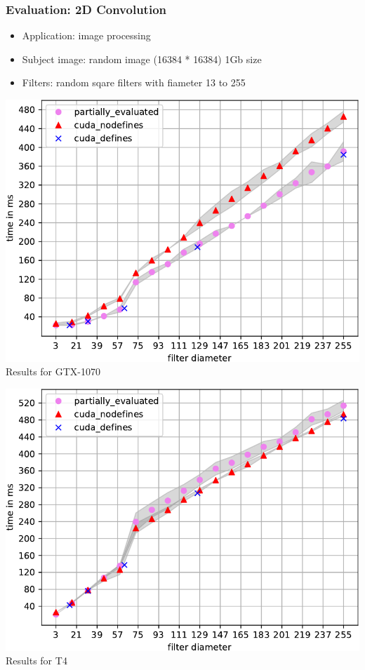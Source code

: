\documentclass[xcolor=table]{beamer}
\begin{document}
\begin{frame}[fragile] \frametitle{Evaluation: 2D Convolution}
  \begin{itemize}
  \item Application: image processing
  \item Subject image: random image (16384 * 16384) 1Gb size
  \item Filters: random sqare filters with fiameter 13 to 255
  \end{itemize}
  \begin{center}
  \begin{minipage}[t]{0.48\textwidth}
    \begin{center}
  {\includegraphics[width=\textwidth]{pictures/Conv_1070-crop}}
  \\Results for GTX-1070
\end{center}
\end{minipage}
\begin{minipage}[t]{0.48\textwidth}
  \begin{center}
{\includegraphics[width=\textwidth]{pictures/Conv_T4-crop}}
\\Results for T4
\end{center}
\end{minipage}
\end{center}
\end{frame}
\end{document}
